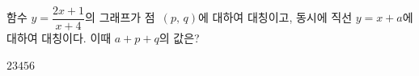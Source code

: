함수 $y=\dfrac{2x+1}{x+4}$의 그래프가 점~$(p,\,q)$에 대하여 대칭이고, 동시에 직선 $y=x+a$에 대하여 대칭이다. 이때 $a+p+q$의 값은? 
\begin{choices32}{$2$}{$3$}{$4$}{$5$}{$6$}\end{choices32}
